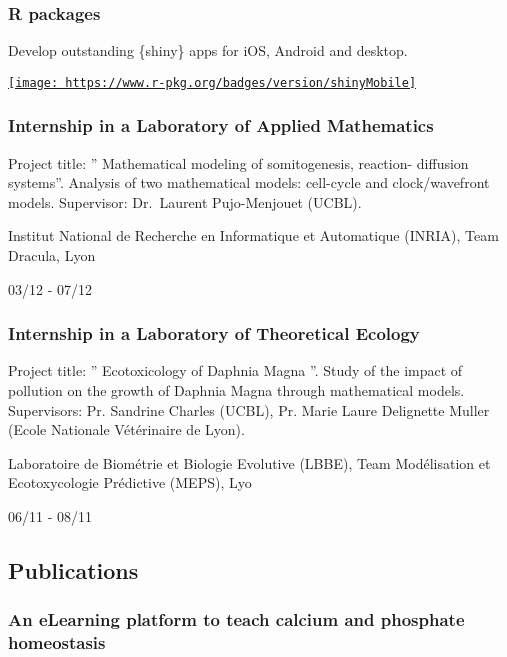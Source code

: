\documentclass[
]{article}
\begin{document}
\hypertarget{packages}{%
\subsubsection{R packages}\label{packages}}

Develop outstanding \{shiny\} apps for iOS, Android and desktop.

\href{https://cran.r-project.org/package=shinyMobile}{\texttt{[image: https://www.r-pkg.org/badges/version/shinyMobile]}}

\hypertarget{internship-in-a-laboratory-of-applied-mathematics-1}{%
\subsubsection{Internship in a Laboratory of Applied
Mathematics}\label{internship-in-a-laboratory-of-applied-mathematics-1}}

Project title: '' Mathematical modeling of somitogenesis, reaction-
diffusion systems''. Analysis of two mathematical models: cell-cycle and
clock/wavefront models. Supervisor: Dr.~Laurent Pujo-Menjouet (UCBL).

Institut National de Recherche en Informatique et Automatique (INRIA),
Team Dracula, Lyon

03/12 - 07/12

\hypertarget{internship-in-a-laboratory-of-theoretical-ecology}{%
\subsubsection{Internship in a Laboratory of Theoretical
Ecology}\label{internship-in-a-laboratory-of-theoretical-ecology}}

Project title: '' Ecotoxicology of Daphnia Magna ''. Study of the impact
of pollution on the growth of Daphnia Magna through mathematical models.
Supervisors: Pr. Sandrine Charles (UCBL), Pr. Marie Laure Delignette
Muller (Ecole Nationale Vétérinaire de Lyon).

Laboratoire de Biométrie et Biologie Evolutive (LBBE), Team Modélisation
et Ecotoxycologie Prédictive (MEPS), Lyo

06/11 - 08/11

\hypertarget{publications}{%
\subsection{Publications}\label{publications}}

\hypertarget{an-elearning-platform-to-teach-calcium-and-phosphate-homeostasis}{%
\subsubsection{An eLearning platform to teach calcium and phosphate
homeostasis}\label{an-elearning-platform-to-teach-calcium-and-phosphate-homeostasis}}
\end{document}
